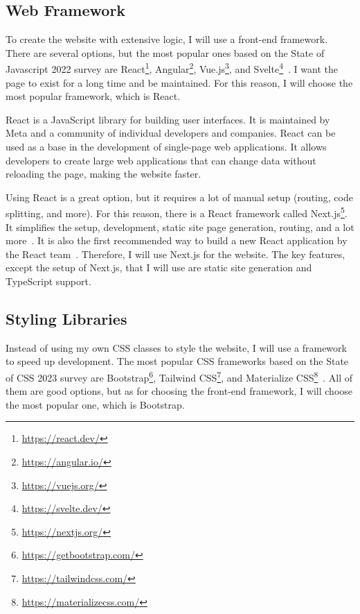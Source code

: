 \subsection{Web Framework}
To create the website with extensive logic, I will use a front-end framework.
There are several options, but the most popular ones based on the State of Javascript 2022 survey are React\footnote{\url{https://react.dev/}}, Angular\footnote{\url{https://angular.io/}}, Vue.js\footnote{\url{https://vuejs.org/}}, and Svelte\footnote{\url{https://svelte.dev/}}~\cite{state-of-js-frontend-frameworks}.
I want the page to exist for a long time and be maintained.
For this reason, I will choose the most popular framework, which is React.

React is a JavaScript library for building user interfaces.
It is maintained by Meta and a community of individual developers and companies.
React can be used as a base in the development of single-page web applications.
It allows developers to create large web applications that can change data without reloading the page, making the website faster.
\cite{react}

Using React is a great option, but it requires a lot of manual setup (routing, code splitting, and more).
For this reason, there is a React framework called Next.js\footnote{\url{https://nextjs.org/}}.
It simplifies the setup, development, static site page generation, routing, and a lot more~\cite{nextjs}.
It is also the first recommended way to build a new React application by the React team~\cite{react-start-new-project}.
Therefore, I will use Next.js for the website.
The key features, except the setup of Next.js, that I will use are static site generation and TypeScript support.

\subsection{Styling Libraries}
Instead of using my own CSS classes to style the website, I will use a framework to speed up development.
The most popular CSS frameworks based on the State of CSS 2023 survey are Bootstrap\footnote{\url{https://getbootstrap.com/}}, Tailwind CSS\footnote{\url{https://tailwindcss.com/}}, and Materialize CSS\footnote{\url{https://materializecss.com/}}~\cite{state-of-css-frameworks}.
All of them are good options, but as for choosing the front-end framework, I will choose the most popular one, which is Bootstrap.

